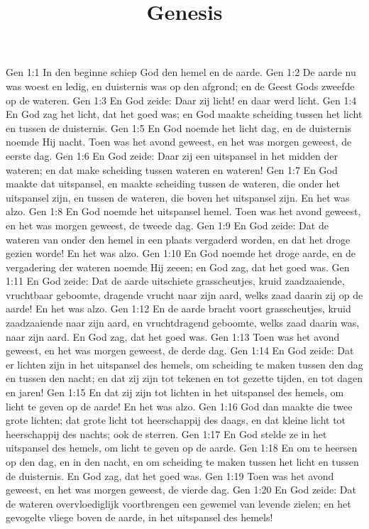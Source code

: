 

\title{Genesis}



Gen 1:1  In den beginne schiep God den hemel en de aarde.
Gen 1:2  De aarde nu was woest en ledig, en duisternis was op den afgrond; en de Geest Gods zweefde op de wateren.
Gen 1:3  En God zeide: Daar zij licht! en daar werd licht.
Gen 1:4  En God zag het licht, dat het goed was; en God maakte scheiding tussen het licht en tussen de duisternis.
Gen 1:5  En God noemde het licht dag, en de duisternis noemde Hij nacht. Toen was het avond geweest, en het was morgen geweest, de eerste dag.
Gen 1:6  En God zeide: Daar zij een uitspansel in het midden der wateren; en dat make scheiding tussen wateren en wateren!
Gen 1:7  En God maakte dat uitspansel, en maakte scheiding tussen de wateren, die onder het uitspansel zijn, en tussen de wateren, die boven het uitspansel zijn. En het was alzo.
Gen 1:8  En God noemde het uitspansel hemel. Toen was het avond geweest, en het was morgen geweest, de tweede dag.
Gen 1:9  En God zeide: Dat de wateren van onder den hemel in een plaats vergaderd worden, en dat het droge gezien worde! En het was alzo.
Gen 1:10  En God noemde het droge aarde, en de vergadering der wateren noemde Hij zeeen; en God zag, dat het goed was.
Gen 1:11  En God zeide: Dat de aarde uitschiete grasscheutjes, kruid zaadzaaiende, vruchtbaar geboomte, dragende vrucht naar zijn aard, welks zaad daarin zij op de aarde! En het was alzo.
Gen 1:12  En de aarde bracht voort grasscheutjes, kruid zaadzaaiende naar zijn aard, en vruchtdragend geboomte, welks zaad daarin was, naar zijn aard. En God zag, dat het goed was.
Gen 1:13  Toen was het avond geweest, en het was morgen geweest, de derde dag.
Gen 1:14  En God zeide: Dat er lichten zijn in het uitspansel des hemels, om scheiding te maken tussen den dag en tussen den nacht; en dat zij zijn tot tekenen en tot gezette tijden, en tot dagen en jaren!
Gen 1:15  En dat zij zijn tot lichten in het uitspansel des hemels, om licht te geven op de aarde! En het was alzo.
Gen 1:16  God dan maakte die twee grote lichten; dat grote licht tot heerschappij des daags, en dat kleine licht tot heerschappij des nachts; ook de sterren.
Gen 1:17  En God stelde ze in het uitspansel des hemels, om licht te geven op de aarde.
Gen 1:18  En om te heersen op den dag, en in den nacht, en om scheiding te maken tussen het licht en tussen de duisternis. En God zag, dat het goed was.
Gen 1:19  Toen was het avond geweest, en het was morgen geweest, de vierde dag.
Gen 1:20  En God zeide: Dat de wateren overvloediglijk voortbrengen een gewemel van levende zielen; en het gevogelte vliege boven de aarde, in het uitspansel des hemels!
